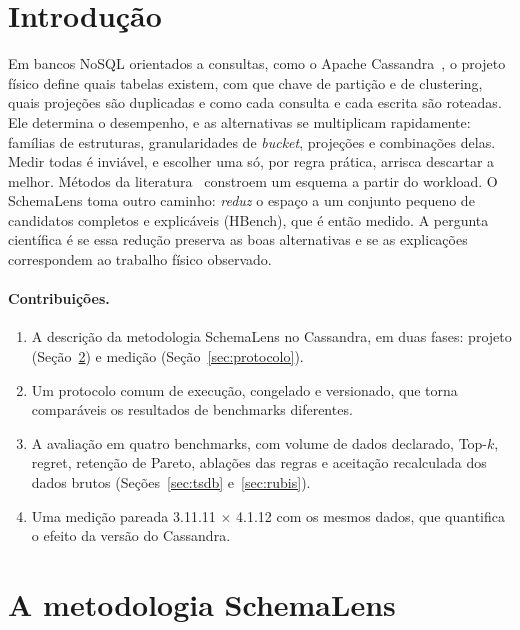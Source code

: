 \documentclass[10pt,a4paper,twoside]{article}
\theoremstyle{definition}\newtheorem{definicao}{Definição}
\begin{document}
\tableofcontents
\newpage

\section{Introdução}
Em bancos NoSQL orientados a consultas, como o Apache Cassandra~\cite{lakshman}, o projeto físico define quais tabelas existem, com que chave de partição e de clustering, quais projeções são duplicadas e como cada consulta e cada escrita são roteadas. Ele determina o desempenho, e as alternativas se multiplicam rapidamente: famílias de estruturas, granularidades de \emph{bucket}, projeções e combinações delas. Medir todas é inviável, e escolher uma só, por regra prática, arrisca descartar a melhor. Métodos da literatura~\cite{chebotko,nose} constroem um esquema a partir do workload. O SchemaLens toma outro caminho: \emph{reduz} o espaço a um conjunto pequeno de candidatos completos e explicáveis (HBench), que é então medido. A pergunta científica é se essa redução preserva as boas alternativas e se as explicações correspondem ao trabalho físico observado.

\paragraph{Contribuições.}
\begin{enumerate}
\item A descrição da metodologia SchemaLens no Cassandra, em duas fases: projeto (Seção~\ref{sec:metodo}) e medição (Seção~\ref{sec:protocolo}).
\item Um protocolo comum de execução, congelado e versionado, que torna comparáveis os resultados de benchmarks diferentes.
\item A avaliação em quatro benchmarks, com volume de dados declarado, Top-$k$, regret, retenção de Pareto, ablações das regras e aceitação recalculada dos dados brutos (Seções~\ref{sec:tsdb} e~\ref{sec:rubis}).
\item Uma medição pareada 3.11.11 $\times$ 4.1.12 com os mesmos dados, que quantifica o efeito da versão do Cassandra.
\end{enumerate}

\section{A metodologia SchemaLens}\label{sec:metodo}
\end{document}
